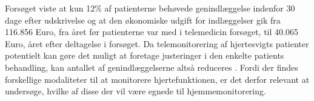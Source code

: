Forsøget viste at kun 12\% af patienterne behøvede genindlæggelse indenfor 30 dage efter udskrivelse og at den økonomiske udgift for indlæggelser gik fra 116.856 Euro, fra året før patienterne var med i telemedicin forsøget, til 40.065 Euro, året efter deltagelse i forsøget. \citep{teleprog} Da telemonitorering af hjertesvigts patienter potentielt kan gøre det muligt at foretage justeringer i den enkelte patients behandling, kan antallet af genindlæggelserne altså reduceres \citep{Inan2018}.
Fordi der findes forskellige modaliteter til at monitorere hjertefunktionen, er det derfor relevant at undersøge, hvilke af disse der vil være egnede til hjemmemonitorering.